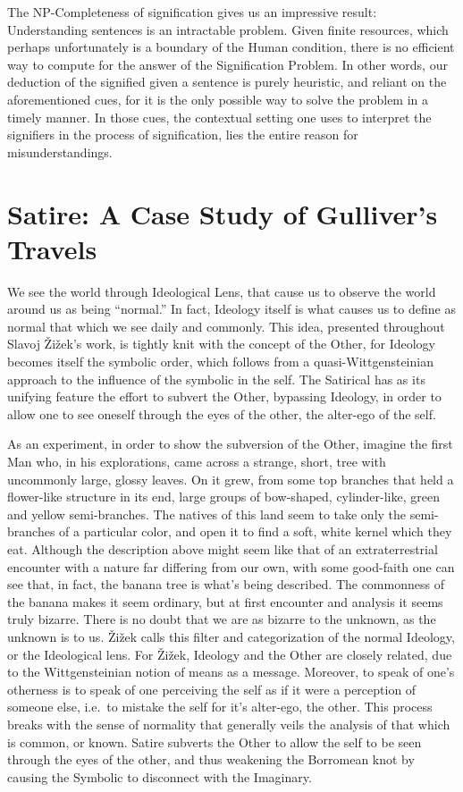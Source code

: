 \documentclass[11pt,letterpaper]{article}
\theoremstyle{definition}
\begin{document}
The NP-Completeness of signification gives us an impressive result: Understanding sentences is an intractable problem. Given finite resources, which perhaps unfortunately is a boundary of the Human condition, there is no efficient way to compute for the answer of the Signification Problem. In other words, our deduction of the signified given a sentence is purely heuristic, and reliant on the aforementioned cues, for it is the only possible way to solve the problem in a timely manner. In those cues, the contextual setting one uses to interpret the signifiers in the process of signification, lies the entire reason for misunderstandings.

\section{Satire: A Case Study of Gulliver's Travels}
We see the world through Ideological Lens, that cause us to observe the world around us as being ``normal.'' In fact, Ideology itself is what causes us to define as normal that which we see daily and commonly. This idea, presented throughout Slavoj Žižek's work,\autocite{zizek_2012} is tightly knit with the concept of the Other, for Ideology becomes itself the symbolic order, which follows from a quasi-Wittgensteinian approach to the influence of the symbolic in the self. The Satirical has as its unifying feature the effort to subvert the Other, bypassing Ideology, in order to allow one to see oneself through the eyes of the other, the alter-ego of the self.

As an experiment, in order to show the subversion of the Other, imagine the first Man who, in his explorations, came across a strange, short, tree with uncommonly large, glossy leaves. On it grew, from some top branches that held a flower-like structure in its end, large groups of bow-shaped, cylinder-like, green and yellow semi-branches. The natives of this land seem to take only the semi-branches of a particular color, and open it to find a soft, white kernel which they eat. Although the description above might seem like that of an extraterrestrial encounter with a nature far differing from our own, with some good-faith one can see that, in fact, the banana tree is what's being described. The commonness of the banana makes it seem ordinary, but at first encounter and analysis it seems truly bizarre. There is no doubt that we are as bizarre to the unknown, as the unknown is to us. Žižek calls this filter and categorization of the normal Ideology, or the Ideological lens. For Žižek, Ideology and the Other are closely related, due to the Wittgensteinian notion of means as a message. Moreover, to speak of one's otherness is to speak of one perceiving the self as if it were a perception of someone else, i.e.\ to mistake the self for it's alter-ego, the other. This process breaks with the sense of normality that generally veils the analysis of that which is common, or known. Satire subverts the Other to allow the self to be seen through the eyes of the other, and thus weakening the Borromean knot by causing the Symbolic to disconnect with the Imaginary.
\end{document}
